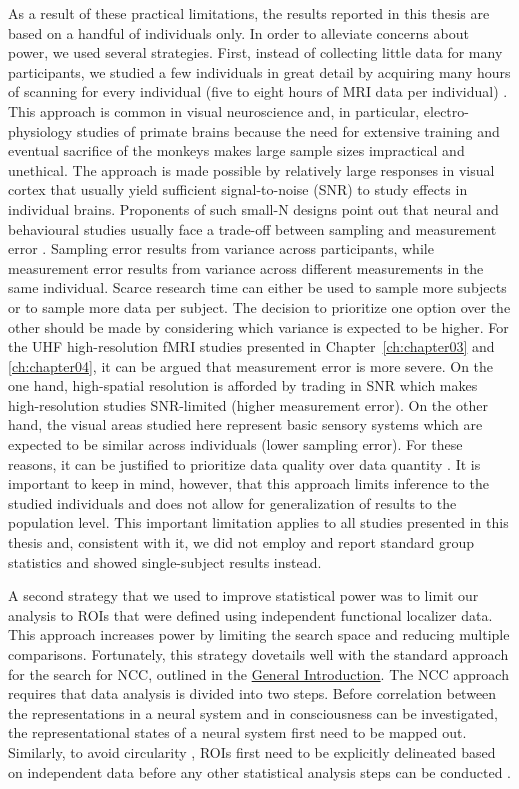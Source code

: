 As a result of these practical limitations, the results reported in this thesis are based on a handful of individuals only. In order to alleviate concerns about power, we used several strategies. First, instead of collecting little data for many participants, we studied a few individuals in great detail by acquiring many hours of scanning for every individual (five to eight hours of MRI data per individual) \parencite{Poldrack2017b}. This approach is common in visual neuroscience and, in particular, electro-physiology studies of primate brains because the need for extensive training and eventual sacrifice of the monkeys makes large sample sizes impractical and unethical. The approach is made possible by relatively large responses in visual cortex that usually yield sufficient signal-to-noise (SNR) to study effects in individual brains. Proponents of such small-N designs point out that neural and behavioural studies usually face a trade-off between sampling and measurement error \parencite{Kolossa2018, Smith2018}. Sampling error results from variance across participants, while measurement error results from variance across different measurements in the same individual. Scarce research time can either be used to sample more subjects or to sample more data per subject. The decision to prioritize one option over the other should be made by considering which variance is expected to be higher. For the UHF high-resolution fMRI studies presented in Chapter~\ref{ch:chapter03} and \ref{ch:chapter04}, it can be argued that measurement error is more severe. On the one hand, high-spatial resolution is afforded by trading in SNR which makes high-resolution studies SNR-limited (higher measurement error). On the other hand, the visual areas studied here represent basic sensory systems which are expected to be similar across individuals (lower sampling error). For these reasons, it can be justified to prioritize data quality over data quantity \parencite{Kolossa2018}. It is important to keep in mind, however, that this approach limits inference to the studied individuals and does not allow for generalization of results to the population level. This important limitation applies to all studies presented in this thesis and, consistent with it, we did not employ and report standard group statistics and showed single-subject results instead.

A second strategy that we used to improve statistical power was to limit our analysis to ROIs that were defined using independent functional localizer data. This approach increases power by limiting the search space and reducing multiple comparisons. Fortunately, this strategy dovetails well with the standard approach for the search for NCC, outlined in the \hyperref[ch:chapter01]{General Introduction}. The NCC approach requires that data analysis is divided into two steps. Before correlation between the representations in a neural system and in consciousness can be investigated, the representational states of a neural system first need to be mapped out. Similarly, to avoid circularity \parencite{Kriegeskorte2009}, ROIs first need to be explicitly delineated based on independent data before any other statistical analysis steps can be conducted \parencite{Poldrack2017a}.

